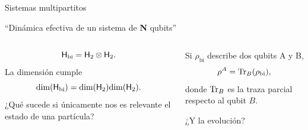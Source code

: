 \begin{frame}{Sistemas multipartitos}
    \begin{center}
        ``Dinámica efectiva de un sistema de \textbf{N} qubits''
    \end{center}
    \pause
    \begin{columns}
        \begin{column}{0.5\textwidth}
            \begin{equation}
                {\sf H}_{\text{bi}}={\sf H}_{2}\otimes{\sf H}_{2}.\nonumber
            \end{equation} \pause
            La dimensión cumple
           \begin{equation}
               \text{dim}({\sf H}_{\text{bi}})=\text{dim}({\sf H}_{2})\text{dim}({\sf H}_{2}).\nonumber
           \end{equation}
           \pause
           ¿Qué sucede si únicamente nos es relevante el estado de una partícula?
        \end{column}
        \pause
        \begin{column}{0.5\textwidth}
             Si $\rho_{\text{bi}}$ describe dos qubits A y B, \pause
            \begin{equation}
                \rho^{A}=\Tr_{B}(\rho_{\text{bi}}),\nonumber
            \end{equation}
            donde $\Tr_{B}$ es la traza parcial respecto al qubit $B$.\\
            \pause
            \begin{center}
                ¿Y la evolución?
            \end{center}
        \end{column}
    \end{columns}
\end{frame}

